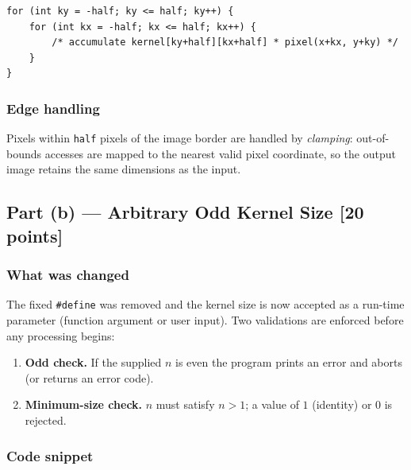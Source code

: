 \documentclass[12pt,a4paper]{article}
\begin{document}
\begin{lstlisting}
for (int ky = -half; ky <= half; ky++) {
    for (int kx = -half; kx <= half; kx++) {
        /* accumulate kernel[ky+half][kx+half] * pixel(x+kx, y+ky) */
    }
}
\end{lstlisting}

\subsubsection*{Edge handling}
Pixels within \texttt{half} pixels of the image border are handled by
\emph{clamping}: out-of-bounds accesses are mapped to the nearest valid pixel
coordinate, so the output image retains the same dimensions as the input.

\subsection{Part (b) — Arbitrary Odd Kernel Size \textnormal{[20 points]}}

\subsubsection*{What was changed}
The fixed \texttt{\#define} was removed and the kernel size is now accepted as a
run-time parameter (function argument or user input). Two validations are
enforced before any processing begins:

\begin{enumerate}[label=\arabic*.]
    \item \textbf{Odd check.} If the supplied \(n\) is even the program prints an
          error and aborts (or returns an error code).
    \item \textbf{Minimum-size check.} \(n\) must satisfy \(n > 1\); a value of
          \(1\) (identity) or \(0\) is rejected.
\end{enumerate}

\subsubsection*{Code snippet}
\end{document}
